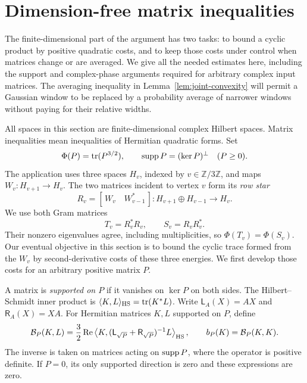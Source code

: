 \section{Dimension-free matrix inequalities}\label{sec:matrix}

The finite-dimensional part of the argument has two tasks: to bound a
cyclic product by positive quadratic costs, and to keep those costs
under control when matrices change or are averaged.  We give all the
needed estimates here, including the support and complex-phase
arguments required for arbitrary complex input matrices.
The averaging inequality in Lemma~\ref{lem:joint-convexity} will permit
a Gaussian window to be replaced by a probability average of narrower
windows without paying for their relative widths.

All spaces in this section are finite-dimensional complex Hilbert
spaces.  Matrix inequalities mean inequalities of Hermitian quadratic
forms.  Set
\[
 \Phi(P)=\operatorname{tr}(P^{3/2}),\qquad \operatorname{supp} P=(\ker P)^\perp
 \quad(P\ge0).
\]
The application uses three spaces $H_v$, indexed by
$v\in\mathbb Z/3\mathbb Z$, and maps $W_v:H_{v+1}\to H_v$.
The two matrices incident to vertex $v$ form its \emph{row star}
\begin{equation}\label{eq:row-star}
 R_v=[\,W_v\quad W_{v-1}^*\,]:
 H_{v+1}\oplus H_{v-1}\longrightarrow H_v.
\end{equation}
We use both Gram matrices
\begin{equation}\label{eq:star-grams}
 T_v=R_v^*R_v,\qquad S_v=R_vR_v^*.
\end{equation}
Their nonzero eigenvalues agree, including multiplicities, so
$\Phi(T_v)=\Phi(S_v)$. Our eventual objective in this section is to
bound the cyclic trace formed from the $W_v$ by second-derivative
costs of these three energies. We first develop those costs for an
arbitrary positive matrix $P$.

A matrix is \emph{supported on $P$} if it vanishes on $\ker P$ on
both sides.  The Hilbert--Schmidt inner product is
$\langle K,L\rangle_{\mathrm{HS}}=\operatorname{tr}(K^*L)$.  Write
$\mathsf L_A(X)=AX$ and $\mathsf R_A(X)=XA$.  For Hermitian matrices
$K,L$ supported on $P$, define
\begin{equation}\label{eq:hessian-form}
 \mathcal B_P(K,L)=\frac32\operatorname{Re}
 \left\langle K,
 (\mathsf L_{\sqrt P}+\mathsf R_{\sqrt P})^{-1}L
 \right\rangle_{\mathrm{HS}},
 \qquad b_P(K)=\mathcal B_P(K,K).
\end{equation}
The inverse is taken on matrices acting on $\operatorname{supp} P$, where the
operator is positive definite.  If $P=0$, its only supported direction
is zero and these expressions are zero.

